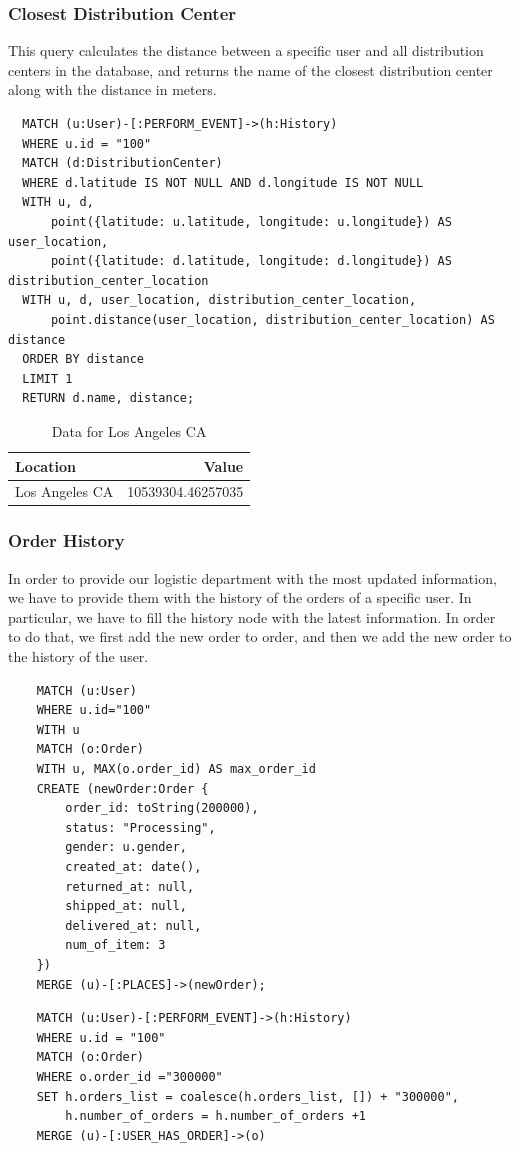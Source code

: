 \documentclass[a4paper,12pt]{article}
\begin{document}
\subsubsection{Closest Distribution Center}
This query calculates the distance between a specific user and all distribution centers in the database, and returns the name of the closest distribution center along with the distance in meters.
\begin{verbatim}
  MATCH (u:User)-[:PERFORM_EVENT]->(h:History)
  WHERE u.id = "100"
  MATCH (d:DistributionCenter)
  WHERE d.latitude IS NOT NULL AND d.longitude IS NOT NULL
  WITH u, d, 
      point({latitude: u.latitude, longitude: u.longitude}) AS user_location, 
      point({latitude: d.latitude, longitude: d.longitude}) AS distribution_center_location
  WITH u, d, user_location, distribution_center_location, 
      point.distance(user_location, distribution_center_location) AS distance
  ORDER BY distance
  LIMIT 1
  RETURN d.name, distance;
\end{verbatim}

\begin{table}[h!]
  \centering
  \caption{Data for Los Angeles CA}
  \label{tab:los_angeles_data}
  \begin{tabular}{l r}
      \toprule
      \textbf{Location} & \textbf{Value} \\
      \midrule
      Los Angeles CA & 10539304.46257035 \\
      \bottomrule
  \end{tabular}
\end{table}

\subsubsection{Order History}
In order to provide our logistic department with the most updated information, we have to provide them with the history of the orders of a specific user.
In particular, we have to fill the history node with the latest information. In order to do that, we first add the new order to order, and then we add the new order to the history of the user.
\begin{verbatim}
    MATCH (u:User)
    WHERE u.id="100"
    WITH u
    MATCH (o:Order)
    WITH u, MAX(o.order_id) AS max_order_id
    CREATE (newOrder:Order { 
        order_id: toString(200000), 
        status: "Processing",
        gender: u.gender,
        created_at: date(),
        returned_at: null,
        shipped_at: null,
        delivered_at: null,
        num_of_item: 3
    })
    MERGE (u)-[:PLACES]->(newOrder);
\end{verbatim}
\begin{verbatim}
    MATCH (u:User)-[:PERFORM_EVENT]->(h:History)
    WHERE u.id = "100"
    MATCH (o:Order)
    WHERE o.order_id ="300000"
    SET h.orders_list = coalesce(h.orders_list, []) + "300000",
        h.number_of_orders = h.number_of_orders +1
    MERGE (u)-[:USER_HAS_ORDER]->(o)
\end{verbatim}
\end{document}
